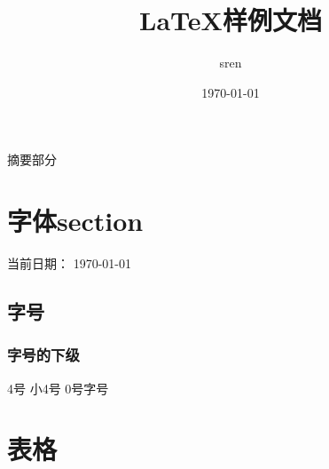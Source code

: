 \documentclass[UTF8]{ctexart}
\title{LaTeX样例文档}
\author{sren}
\date{\today}
\begin{document}
\maketitle
\thispagestyle{empty} %

\newpage
摘要部分


\newpage
\tableofcontents                
\newpage
\listoffigures
\newpage
\listoftables

\newpage %


\section{字体section}
当前日期： \today
\subsection{字号}
\subsubsection{字号的下级}
\noindent
{} 4号 \newline
{} 小4号
 0号字号


\section{表格}
\end{document}
